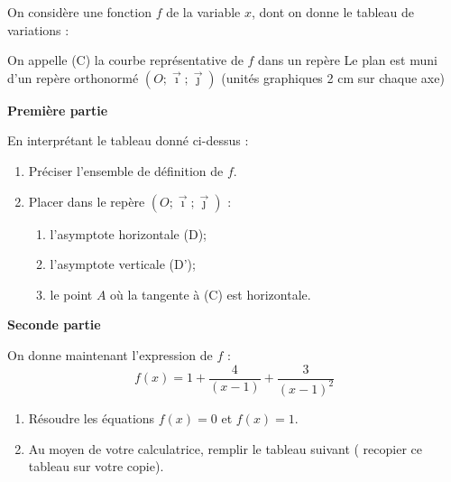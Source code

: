 {\parindent=0pt
On considère une fonction $f$ de la variable $x$, dont on donne le tableau de variations :

\begin{center}
\end{center}

On appelle (C) la courbe représentative de $f$ dans un repère Le plan est muni d'un repère orthonormé $(O;\vec{\imath};\vec{\jmath})$ (unités graphiques 2 cm sur chaque axe)
 
\vspace{6pt}
\textbf{Première partie}

En interprétant le tableau donné ci-dessus :%
 
 \begin{enumerate}
 \item  Préciser l'ensemble de définition de $f$.
 \item  Placer dans le repère $(O;\vec{\imath};\vec{\jmath})$  :
 \begin{enumerate}
 \item  l'asymptote horizontale (D);
 \item  l'asymptote verticale (D');
 \item  le point $A$ où la tangente à (C) est horizontale.
 \end{enumerate}
 \end{enumerate}

\textbf{Seconde partie}

On donne maintenant l'expression de $f$ :
\[
f(x)=1 + \dfrac{4}{(x-1)}    + \dfrac{3}{(x-1)^2}
\]
\begin{enumerate}
 \item Résoudre les équations $f(x)=0$ et $f(x)=1$.
 \item  Au moyen de votre calculatrice, remplir le tableau suivant
  ( recopier ce tableau sur votre copie).
\end{enumerate}
}


